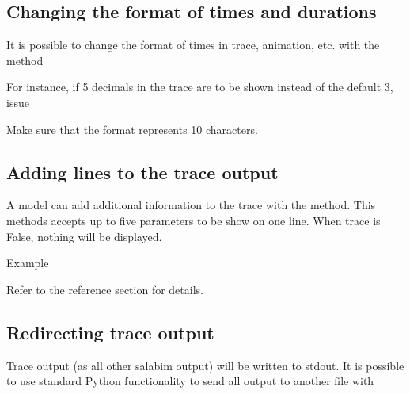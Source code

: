 \documentclass[letterpaper,10pt,english]{sphinxmanual}
\begin{document}
\subsection{Changing the format of times and durations}
\label{\detokenize{Miscellaneous:changing-the-format-of-times-and-durations}}
It is possible to change the format of times in trace, animation, etc. with the method  

For instance, if 5 decimals in the trace are to be shown instead of the default 3, issue

\begin{sphinxVerbatim}[commandchars=\\\{\}]
\end{sphinxVerbatim}

Make sure that the format represents 10 characters.


\subsection{Adding lines to the trace output}
\label{\detokenize{Miscellaneous:adding-lines-to-the-trace-output}}
A model can add additional information to the trace with the  method. This methods accepts up to five parameters to be show on one line. When trace is False, nothing will be displayed.

Example

\begin{sphinxVerbatim}[commandchars=\\\{\}]
   
\end{sphinxVerbatim}

Refer to the reference section for details.


\subsection{Redirecting trace output}
\label{\detokenize{Miscellaneous:redirecting-trace-output}}
Trace output (as all other salabim output) will be written to stdout. It is possible to use standard Python functionality to send all output to another file with
\end{document}
